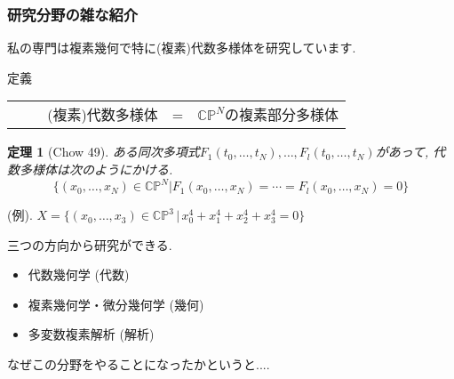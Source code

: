 \documentclass[11pt,dvipdfmx]{beamer}
\newtheorem{theore}{定理}
\theoremstyle{definition}
\theoremstyle{remark}
\begin{document}
\begin{frame}
\frametitle{研究分野の雑な紹介}
\vspace{0pt}
私の専門は複素幾何で特に(複素)代数多様体を研究しています.
   \begin{exampleblock}{定義}
  \begin{center}
 \begin{tabular}{lll}
　(複素)代数多様体 &=&  $\mathbb{CP}^N$の複素部分多様体\\
\end{tabular}
\end{center}
   \end{exampleblock}

\begin{theore}[Chow 49]
ある同次多項式$F_{1}(t_0, \ldots, t_{N}), \ldots, F_{l}(t_0, \ldots, t_{N})$があって, 代数多様体は次のようにかける.
$$
 \{ (x_0, \ldots, x_N) \in \mathbb{CP}^N |  F_1(x_0, \ldots, x_N) =\cdots =F_{l}(x_0, \ldots, x_N)=0 \}
$$
\end{theore}

(例). $X=\{ (x_0, \ldots, x_3) \in \mathbb{CP}^3 \, |\, x_{0}^{4} + x_{1}^{4} +   x_{2}^{4} +   x_{3}^{4} =0    \}$

三つの方向から研究ができる.
\begin{itemize}
\item 代数幾何学 (代数)
\item 複素幾何学・微分幾何学 (幾何)
\item 多変数複素解析 (解析)
\end{itemize}

なぜこの分野をやることになったかというと....
\end{frame}
\end{document}
